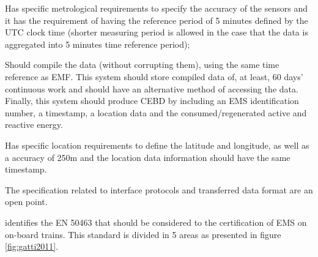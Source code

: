 \begin{description}
	\setlength\itemsep{-0.5em}
	
	\item [Energy Measurement Function (EMF)] Has specific metrological requirements to specify the accuracy of the sensors and it has the requirement of having the reference period of 5 minutes defined by the UTC clock time (shorter measuring period is allowed in the case that the data is aggregated into 5 minutes time reference period);
	
	\item [Data Handling System (DHS)] Should compile the data (without corrupting them), using the same time reference as \ac{EMF}. This system should store compiled data of, at least, 60 days' continuous work and should have an alternative method of accessing the data. Finally, this system should produce \ac{CEBD} by including an EMS identification number, a timestamp, a location data and the consumed/regenerated active and reactive energy.
	
	\item [Location function] Has specific location requirements to define the latitude and longitude, as well as a accuracy of 250m and the location data information should have the same timestamp.
	
	\item [On-board to ground communication] The specification related to interface protocols and transferred data format are an open point.
	
\end{description} 


	\newpage
	
 \cite{metas2015} identifies the EN 50463 that should be considered to the certification of \ac{EMS} on on-board trains. This standard is divided in 5 areas as presented in figure \ref{fig:gatti2011}.
 



